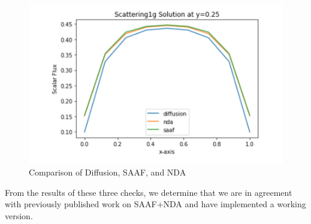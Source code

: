 \begin{figure}[H]
    \centering
    \includegraphics[width=.75\textwidth]{fig/LineOut25.png}
    \caption{Comparison of Diffusion, SAAF, and NDA}
    \label{fig:comparison}
\end{figure}

From the results of these three checks, we determine that we are in agreement with previously published work on SAAF+NDA and have implemented a working version. 
